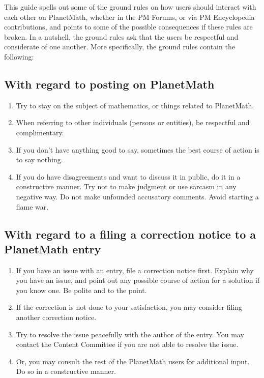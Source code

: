 
This guide spells out some of the ground rules on how users should
interact with each other on PlanetMath, whether in the PM Forums, or via PM Encyclopedia contributions, and points to some of the possible consequences if these rules are broken. In a nutshell, the ground rules ask that the users be respectful and considerate of one another. More specifically, the ground rules contain the following:

\subsection*{With regard to posting on PlanetMath}
\begin{enumerate}
\item Try to stay on the subject of mathematics, or things related to PlanetMath.
\item When referring to other individuals (persons or entities), be respectful and complimentary.
\item If you don't have anything good to say, sometimes the best course of action is to say nothing.
\item If you do have disagreements and want to discuss it in public, do it in a constructive manner. Try not to make judgment or use sarcasm in any negative way. Do not make unfounded accusatory comments. Avoid starting a flame war.
\end{enumerate}

\subsection*{With regard to a filing a correction notice to a PlanetMath entry}
\begin{enumerate}
\item If you have an issue with an entry, file a correction notice first. Explain why you have an issue, and point out any possible course of action for a solution if you know one. Be polite and to the point.
\item If the correction is not done to your satisfaction, you may consider filing another correction notice.
\item Try to resolve the issue peacefully with the author of the entry. You may contact the Content Committee if you are not able to resolve the issue.
\item Or, you may consult the rest of the PlanetMath users for additional input. Do so in a constructive manner.
\end{enumerate}

